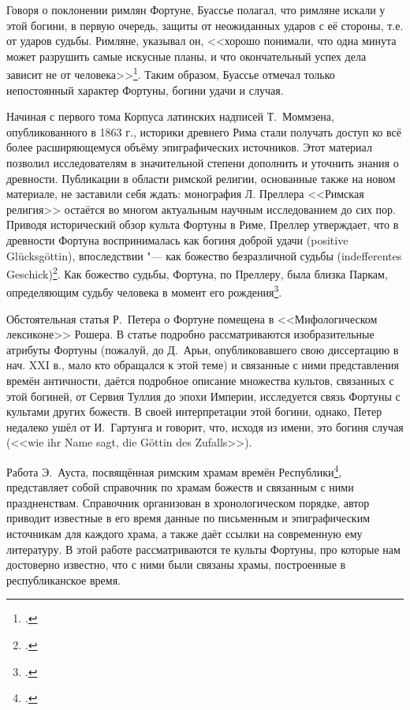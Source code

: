 Говоря о поклонении римлян Фортуне, Буассье полагал, что римляне искали у этой богини, в первую очередь, защиты от неожиданных ударов с её стороны, т.е. от ударов судьбы. Римляне, указывал он, <<хорошо понимали, что одна минута может разрушить самые искусные планы, и что окончательный успех дела зависит не от человека>>\footcite[С. 204]{Boissier1914}. Таким образом, Буассье отмечал только непостоянный характер Фортуны, богини удачи и случая.



Начиная с первого тома Корпуса латинских надписей Т.~Моммзена, опубликованного в 1863 г., историки древнего Рима стали получать доступ ко всё более расширяющемуся объёму эпиграфических источников. Этот материал позволил исследователям в значительной степени дополнить и уточнить знания о древности. Публикации в области римской религии, основанные также на новом материале, не  заставили себя ждать: монография Л. Преллера <<Римская религия>> остаётся во многом актуальным научным исследованием до сих пор. Приводя исторический обзор культа Фортуны в Риме, Преллер утверждает, что в древности Фортуна воспринималась как богиня доброй удачи (positive Gl\"{u}cksg\"{o}ttin), впоследствии "--- как божество безразличной судьбы (indefferentes Geschick)\footcite[S. 179]{Preller1883}. Как божество судьбы, Фортуна, по Преллеру, была близка Паркам, определяющим судьбу человека в момент его рождения\footcite[S. 193]{Preller1883}.


Обстоятельная статья Р.~Петера о Фортуне помещена в <<Мифологическом лексиконе>> Рошера. В статье подробно рассматриваются изобразительные атрибуты Фортуны (пожалуй, до Д.~Арьи, опубликовавшего свою диссертацию в нач. XXI в., мало кто обращался к этой теме) и связанные с ними представления времён античности, даётся подробное описание множества культов, связанных с этой богиней, от Сервия Туллия до эпохи Империи, исследуется связь Фортуны с культами других божеств. В своей интерпретации этой богини, однако, Петер недалеко ушёл от И.~Гартунга и говорит, что, исходя из имени, это богиня случая (<<wie ihr Name sagt, die G\"{o}ttin des Zufalls>>).


Работа Э.~Ауста, посвящённая римским храмам времён Республики\footcite{Aust1889}, представляет собой справочник по храмам божеств и связанным с ними праздненствам. Справочник организован в хронологическом порядке, автор приводит известные в его время данные по письменным и эпиграфическим источникам для каждого храма, а также даёт ссылки на современную ему литературу. В этой работе рассматриваются те культы Фортуны, про которые нам достоверно известно, что с ними были связаны храмы, построенные в республиканское время.


